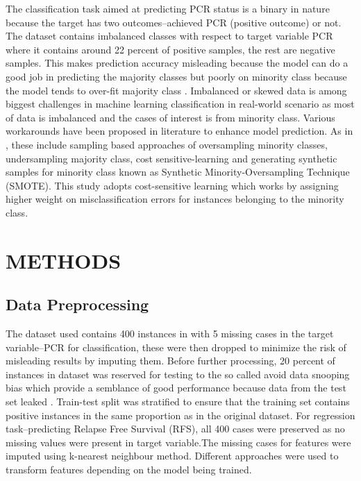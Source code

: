 \documentclass{article}
\begin{document}
The classification task aimed at predicting PCR status is a binary in nature  because the target has two outcomes--achieved PCR (positive outcome) or not. The dataset contains imbalanced classes with respect to target variable PCR where it contains around 22 percent of positive samples, the rest are negative samples. This makes prediction accuracy misleading because the model can do a good job in predicting the majority classes but poorly on minority class because the model tends to  over-fit majority class \cite{spelmen2018review,pristyanto2018}. Imbalanced or skewed data is among biggest challenges in machine learning classification in real-world scenario as most of data is imbalanced and the cases of interest is from minority class. Various workarounds have been proposed in literature to enhance model prediction. As in \cite{spelmen2018review,sukhanov2015}, these include sampling based approaches  of oversampling minority classes, undersampling majority class, cost sensitive-learning and generating synthetic samples for minority class known as Synthetic Minority-Oversampling Technique (SMOTE). This study adopts cost-sensitive learning which works by assigning higher weight on misclassification errors for instances belonging to the minority class.  



\section{METHODS}
\label{sec:methods}
\subsection{Data Preprocessing}
The dataset used contains 400 instances in with 5 missing cases in the target variable--PCR for classification, these were then dropped to minimize the risk of misleading results by imputing them. Before further processing, 20 percent of instances in dataset was reserved for testing to the so called avoid data snooping bias which provide a semblance of good performance because data from the test set leaked \cite{geron2022hands}. Train-test split was stratified to ensure that the training set contains positive instances in the same proportion as in the original dataset. For regression task--predicting Relapse Free Survival (RFS), all 400 cases were preserved as no missing values were present in target variable.The missing cases for features were imputed using k-nearest neighbour method. Different approaches were used to transform features depending on the model being trained. 
\end{document}
